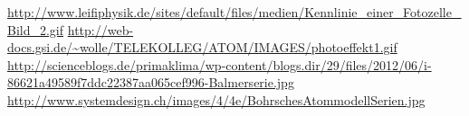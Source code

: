 \documentclass[pdftex, a4paper,11pt, twoside, ngerman]{report}
\begin{document}
  \begin{thebibliography}{99}
    \scriptsize
    \url{http://www.leifiphysik.de/sites/default/files/medien/Kennlinie_einer_Fotozelle_Bild_2.gif}
    \url{http://web-docs.gsi.de/~wolle/TELEKOLLEG/ATOM/IMAGES/photoeffekt1.gif}
    \url{http://scienceblogs.de/primaklima/wp-content/blogs.dir/29/files/2012/06/i-86621a49589f7ddc22387aa065cef996-Balmerserie.jpg}
    \url{http://www.systemdesign.ch/images/4/4e/BohrschesAtommodellSerien.jpg}
    
  \end{thebibliography}
  
\end{document}
